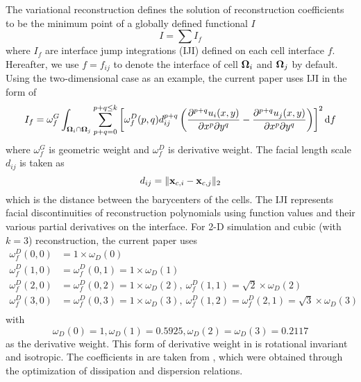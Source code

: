 \documentclass[preprint,12pt]{elsarticle}
\begin{document}
The variational reconstruction defines the solution of reconstruction coefficients
to be the minimum point of a globally defined functional $I$
\begin{equation}
    I = \sum{I_f}
\end{equation}
where $I_f$ are interface jump integrations (IJI) defined on each cell interface $f$.
Hereafter, we use $f=f_{ij}$ to denote the interface of cell $\mathbf{\Omega}_{i}$ and $\mathbf{\Omega}_{j}$ by default.
Using the two-dimensional case as an example, the current paper uses IJI in the form of
\begin{equation}
    I_f = \omega_f^G\int_{\OO_i \cap \OO_j}{
        \sum_{p+q=0}^{p + q\leq k}\left[
            \omega_f^D(p,q)
            d_{ij}^{p+q}
            \left(
            \partialderivative{^{p+q}u_i(x,y)}{x^p\partial y^q}
            -
            \partialderivative{^{p+q}u_j(x,y)}{x^p\partial y^q}
            \right)
            \right]^2
        \dd f
    }
\end{equation}
where $\omega_f^G$ is geometric weight and
$\omega_f^D$ is derivative weight. 
The facial length scale  $d_{ij}$
is taken as 
\begin{equation}
    d_{ij} = \|\mathbf{x}_{c,i}-\mathbf{x}_{c,j}\|_2
\end{equation}
which is the distance between the barycenters of the cells.
The IJI represents facial discontinuities of reconstruction polynomials using
function values and their various partial derivatives on the interface.
For 2-D simulation and cubic (with $k=3$)
reconstruction, the current paper uses
\begin{equation}
    \begin{aligned}
        \omega_f^D(0,0) & = 1\times \omega_D(0)                                                                                    \\
        \omega_f^D(1,0) & = \omega_f^D(0,1) = 1\times \omega_D(1)                                                                  \\
        \omega_f^D(2,0) & = \omega_f^D(0,2) = 1\times \omega_D(2),\ \omega_f^D(1,1) = \sqrt{2}\times \omega_D(2)                   \\
        \omega_f^D(3,0) & = \omega_f^D(0,3) = 1\times \omega_D(3),\ \omega_f^D(1,2) = \omega_f^D(2,1) = \sqrt{3}\times \omega_D(3) \\
    \end{aligned}
    \label{eq:wdRotRatio}
\end{equation}
with
\begin{equation}
    \omega_D(0) = 1, \omega_D(1) = 0.5925, \omega_D(2) = \omega_D(3) = 0.2117
    \label{eq:wdHQMOPT}
\end{equation}
as the derivative weight.
This form of derivative weight in  is rotational invariant and
isotropic.
The coefficients in  are taken from \cite{huang2022high}, which were
obtained through the
optimization of dissipation and dispersion relations.
\end{document}
